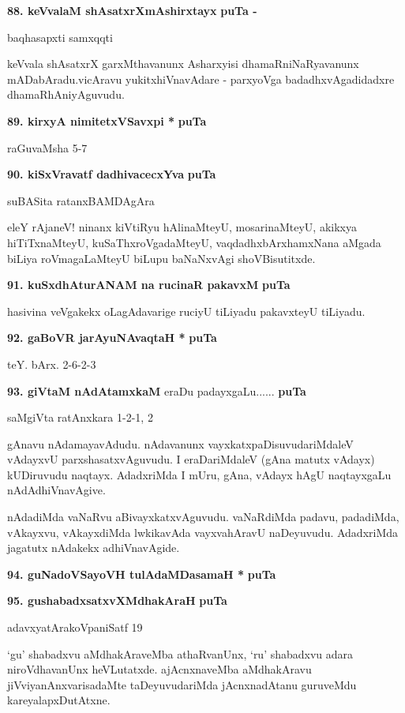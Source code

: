 \medskip
\noindent
\textbf{88. keVvalaM shAsatxrXmAshirxtayx} \hfill{\bf puTa \pageref{64}-\pageref{164}}

\hfill{baqhasapxti samxqqti}

\smallskip
keVvala shAsatxrX garxMthavanunx Asharxyisi dhamaRniNaRyavanunx mADabAradu.\break vicAravu yukitx\-hiVna\-vAdare - parxyoVga badadhxvAgadidadxre dhamaRhAniyAguvudu.


\eject
\noindent
\textbf{89. kirxyA nimitetxVSavxpi *} \hfill{\bf puTa \pageref{56}}

\hfill{raGuvaMsha 5-7}

\medskip
\noindent
\textbf{90. kiSxVravatf dadhivacecxYva} \hfill{\bf puTa \pageref{207a}}

\hfill{suBASita ratanxBAMDAgAra}

\smallskip
eleY rAjaneV! ninanx kiVtiRyu hAlinaMteyU, mosarinaMteyU, akikxya hiTiTxnaMteyU, kuSaThx\-roVgadaMteyU, vaqdadhxbArxhamxNana aMgada biLiya roVmagaLaMteyU biLupu baNaNxvAgi shoVBisutitxde.

\medskip
\noindent
\textbf{91. kuSxdhAturANAM na rucinaR pakavxM} \hfill{\bf puTa \pageref{221}}

\smallskip
hasivina veVgakekx oLagAdavarige ruciyU tiLiyadu pakavxteyU tiLiyadu.

\medskip
\noindent
\textbf{92. gaBoVR jarAyuNAvaqtaH *} \hfill{\bf puTa \pageref{87}}

\hfill{teY. bArx. 2-6-2-3}

\medskip
\noindent
\textbf{93. giVtaM nAdAtamxkaM }eraDu padayxgaLu...... \hfill{\bf puTa \pageref{159}}

\hfill{saMgiVta ratAnxkara 1-2-1, 2}

\smallskip
gAnavu nAdamayavAdudu. nAdavanunx vayxkatxpaDisuvudariMdaleV vAdayxvU parxshasatxvAguvudu. I eraDariMdaleV (gAna matutx vAdayx) kUDiruvudu naqtayx. AdadxriMda I mUru, gAna, vAdayx hAgU naqtayxgaLu nAdAdhiVnavAgive.

nAdadiMda vaNaRvu aBivayxkatxvAguvudu. vaNaRdiMda padavu, padadiMda, vAkayxvu, vAkayxdiMda lwkika\-vAda vayxvahAravU naDeyuvudu. AdadxriMda jagatutx nAdakekx adhiVnavAgide.


\medskip
\noindent
\textbf{94. guNadoVSayoVH tulAdaMDasamaH *} \hfill{\bf puTa \pageref{94}}

\medskip
\noindent
\textbf{95. gushabadxsatxvXMdhakAraH} \hfill{\bf puTa \pageref{190}}

\hfill{adavxyatArakoVpaniSatf 19}

\smallskip
`gu' shabadxvu aMdhakAraveMba athaRvanUnx, `ru' shabadxvu adara niroVdhavanUnx heVLutatxde. ajAcnxna\-veMba aMdhakAravu jiVviyanAnxvarisadaMte taDeyuvudariMda jAcnxnadAtanu guruveMdu kareyalapxDu\-tAtxne.

